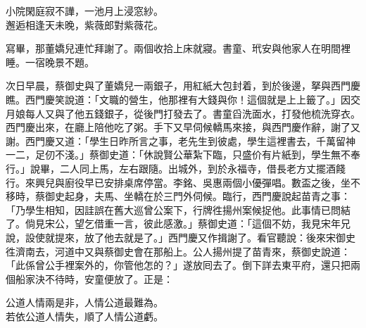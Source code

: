 \begin{myquote} 
小院閑庭寂不譁，一池月上浸窓紗。\\邂逅相逢天未晚，紫薇郎對紫薇花。
\end{myquote} 

寫畢，那董嬌兒連忙拜謝了。兩個收拾上床就寢。書童、玳安與他家人在明間裡睡。一宿晚景不題。

次日早晨，蔡御史與了董嬌兒一兩銀子，用紅紙大包封着，到於後邊，拏與西門慶瞧。西門慶笑說道：「文職的營生，他那裡有大錢與你！這個就是上上籤了。」因交月娘每人又與了他五錢銀子，從後門打發去了。書童舀洗面水，打發他梳洗穿衣。西門慶出來，在廳上陪他吃了粥。手下又早伺候轎馬來接，與西門慶作辭，謝了又謝。西門慶又道：「學生日昨所言之事，老先生到彼處，學生這裡書去，千萬留神一二，足仞不淺。」蔡御史道：「休說賢公華紮下臨，只盛价有片紙到，學生無不奉行。」說畢，二人同上馬，左右跟隨。出城外，到於永福寺，借長老方丈擺酒餞行。來興兒與廚役早已安排桌席停當。李銘、吳惠兩個小優彈唱。數盃之後，坐不移時，蔡御史起身，夫馬、坐轎在於三門外伺候。臨行，西門慶說起苗青之事：「乃學生相知，因詿誤在舊大巡曾公案下，行牌徃揚州案候捉他。此事情已問結了。倘見宋公，望乞借重一言，彼此感激。」蔡御史道：「這個不妨，我見宋年兄說，設使就提來，放了他去就是了。」西門慶又作揖謝了。看官聽說：後來宋御史徃濟南去，河道中又與蔡御史會在那船上。公人揚州提了苗青來，蔡御史說道：「此係曾公手裡案外的，你管他怎的？」遂放囘去了。倒下詳去東平府，還只把兩個船家決不待時，安童便放了。正是：

\begin{myquote} 
公道人情兩是非，人情公道最難為。\\若依公道人情失，順了人情公道虧。
\end{myquote} 

